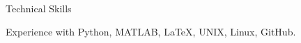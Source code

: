 \documentclass{resume}
\begin{document}
\begin{rSection}{Technical Skills}

{\normalfont Experience with Python, MATLAB, LaTeX, UNIX, Linux, GitHub.}

\end{rSection}


\end{document}
